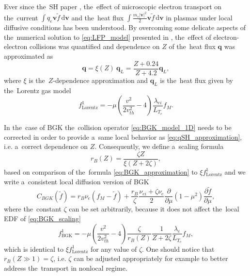 \documentclass[
 aps,
 jmp,
 amsmath,amssymb,
 twocolumn,
]{revtex4-1}
\newcommand{\pdv}[2]{\frac{\partial{#1}}{\partial{#2}}}
\newcommand{\vect}[1]{\boldsymbol{#1}}
\newcommand{\dI}{\text{d}}
\newcommand{\mfpe}{\lambda_e}
\newcommand{\mfpei}{\lambda_{ei}}
\newcommand{\Zbar}{Z}
\newcommand{\nue}{\nu_{e}}
\newcommand{\nuei}{\nu_{ei}}
\newcommand{\vmag}{v}
\newcommand{\vth}{v_{th}}
\newcommand{\qe}{q_e}
\newcommand{\me}{m_e}
\newcommand{\fM}{f_M}
\newcommand{\vv}{\vect{v}}
\newcommand{\ft}{f}
\begin{document}
Ever since the~SH paper \cite{SpitzerHarm_PR1953}, the~effect of microscopic
electron transport on the~current $\int \qe \vv \tilde{\ft} \, \dI\vv$ 
and the~heat flux $\int \frac{\me |\vv|^2}{2} \vv \tilde{\ft} \, \dI\vv$ 
in plasmas
under local diffusive conditions has been understood. By overcoming some 
delicate aspects of the~numerical solution to \eqref{eq:LFP_model} presented 
in \cite{CSR_1950}, the~effect of electron-electron collisions
was quantified and dependence on $\Zbar$ of the~heat flux
$\vect{q}$ was approximated as \cite{SpitzerHarm_PR1953, Epperlein_PoFB1991} 
\begin{equation}
  \vect{q} = \xi(\Zbar)~\vect{q}_L 
  = \frac{\Zbar + 0.24}{\Zbar + 4.2} \vect{q}_L ,
  \label{eq:qSH_approximation}
\end{equation}
where 
$\xi$ is the~$\Zbar$-dependence \cite{Epperlein_PoFB1991} approximation and
$\vect{q}_L$
is the~heat flux given 
by the~Lorentz gas model \cite{Lorentz_1905} 
\begin{equation}
  \ft^1_{\text{Lorentz}} = - \mu 
  \left( \frac{\vmag^2}{2 \vth^2} - 4\right)
  \frac{\mfpei}{L_{T_e}}\fM
  . 
  \label{eq:Lorentz_approximation}
\end{equation}
 
In the~case of BGK the~collision operator \eqref{eq:BGK_model_1D} needs to be 
corrected in order to provide a~same local behavior as 
\eqref{eq:qSH_approximation}, i.e. a~correct dependence on 
$\Zbar$. Consequently, we define a~scaling formula 
\begin{equation}
  r_B(\Zbar) = \frac{\zeta\Zbar}{\xi(\Zbar + 2 \zeta)} ,
  \label{eq:BGK_r_scaling}
\end{equation}
based on comparison of the~formula \eqref{eq:BGK_approximation} to 
$\xi \ft^1_{\text{Lorentz}}$ and we write a~consistent local diffusion version
of BGK 
\begin{equation}
  C_{BGK}(\tilde{\ft})
  =
  r_B \nue(\fM - \tilde{\ft})
  + \frac{r_B}{\zeta}\frac{\nuei + \zeta\nue}{2}
  \pdv{}{\mu}(1 - \mu^2)\pdv{\tilde{\ft}}{\mu}
   ,
  \label{eq:BGK_scaling}
\end{equation}
where the~constant $\zeta$ can be set arbitrarily, because it does not affect 
the~local EDF of \eqref{eq:BGK_scaling}
\begin{equation}
  \ft^1_{\text{BGK}} = - \mu 
  \left( \frac{\vmag^2}{2 \vth^2} - 4\right)\frac{\zeta}{r_B(\Zbar)}
  \frac{1}{\Zbar + 2\zeta}\frac{\mfpe}{L_{T_e}}\fM
  ,
  \label{eq:f1BGK_approximation}
\end{equation}
which is identical to $\xi \ft^1_{\text{Lorentz}}$ for any value of $\zeta$.
One should notice that $r_B(\Zbar\gg1) = \zeta$, i.e. $\zeta$ can be adjusted 
appropriately for example to better address the~transport in nonlocal regime.
\end{document}
